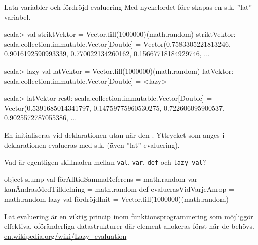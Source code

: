 \begin{Slide}{Lata variabler och fördröjd evaluering}
Med nyckelordet  före  skapas en s.k. ''lat''  variabel.
\begin{REPL}
scala> val striktVektor = Vector.fill(1000000)(math.random)
striktVektor: scala.collection.immutable.Vector[Double] =
 Vector(0.7583305221813246, 0.9016192590993339, 0.770022134260162, 0.15667718184929746, ...

scala> lazy val latVektor = Vector.fill(1000000)(math.random)
latVektor: scala.collection.immutable.Vector[Double] = <lazy>

scala> latVektor
res0: scala.collection.immutable.Vector[Double] =
  Vector(0.5391685014341797, 0.14759775960530275, 0.722606095900537, 0.9025572787055386, ...
\end{REPL}

En  initialiseras  vid deklarationen utan när den . Yttrycket som anges i deklarationen evalueras med s.k.  (även ''lat'' evaluering).
\end{Slide}

\begin{Slide}{Vad är egentligen skillnaden mellan \texttt{val}, \texttt{var}, \texttt{def} och \texttt{lazy val}?}
\begin{Code}[basicstyle=\ttfamily\fontsize{8}{11}\selectfont]
object slump {
  val förAlltidSammaReferens  = math.random
  var kanÄndrasMedTilldelning = math.random
  def evaluerasVidVarjeAnrop  = math.random
  lazy val fördröjdInit       = Vector.fill(1000000)(math.random)
}
\end{Code}
\vspace{1em}\pause
Lat evaluering är en viktig princip inom funktionsprogrammering som möjliggör effektiva, oföränderliga datastrukturer där element allokeras först när de behövs. \\
\href{https://en.wikipedia.org/wiki/Lazy_evaluation}{en.wikipedia.org/wiki/Lazy\_evaluation}
\end{Slide}






